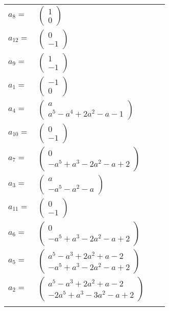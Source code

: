 \documentclass[1p]{elsarticle_modified}
\theoremstyle{definition}
\begin{document}
\begin{tabular}{m{7pt} m{180pt} m{7pt} m{180pt} }
\flushright $a_{8}=$&$\begin{pmatrix}1\\0\end{pmatrix}$ \\
\flushright $a_{12}=$&$\begin{pmatrix}0\\-1\end{pmatrix}$ \\
\flushright $a_{9}=$&$\begin{pmatrix}1\\-1\end{pmatrix}$ \\
\flushright $a_{1}=$&$\begin{pmatrix}-1\\0\end{pmatrix}$ \\
\flushright $a_{4}=$&$\begin{pmatrix}a\\a^5- a^4+2 a^2- a-1\end{pmatrix}$ \\
\flushright $a_{10}=$&$\begin{pmatrix}0\\-1\end{pmatrix}$ \\
\flushright $a_{7}=$&$\begin{pmatrix}0\\- a^5+a^3-2 a^2- a+2\end{pmatrix}$ \\
\flushright $a_{3}=$&$\begin{pmatrix}a\\- a^5- a^2- a\end{pmatrix}$ \\
\flushright $a_{11}=$&$\begin{pmatrix}0\\-1\end{pmatrix}$ \\
\flushright $a_{6}=$&$\begin{pmatrix}0\\- a^5+a^3-2 a^2- a+2\end{pmatrix}$ \\
\flushright $a_{5}=$&$\begin{pmatrix}a^5- a^3+2 a^2+a-2\\- a^5+a^3-2 a^2- a+2\end{pmatrix}$ \\
\flushright $a_{2}=$&$\begin{pmatrix}a^5- a^3+2 a^2+a-2\\-2 a^5+a^3-3 a^2- a+2\end{pmatrix}$\\&\end{tabular}
\end{document}
